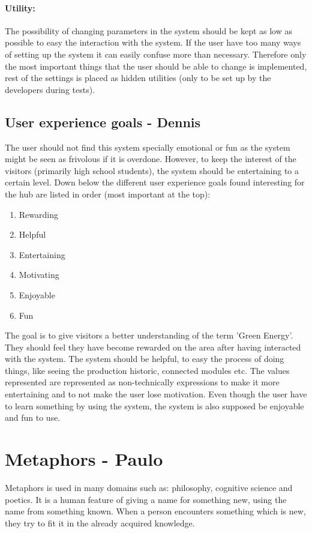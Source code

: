 \paragraph{Utility:}
The possibility of changing parameters in the system should be kept as low as possible to easy the interaction with the system. If the user have too many ways of setting up the system it can easily confuse more than necessary. Therefore only the most important things that the user should be able to change is implemented, rest of the settings is placed as hidden utilities (only to be set up by the developers during tests). 
\subsection{User experience goals - Dennis}
The user should not find this system specially emotional or fun as the system might be seen as frivolous if it is overdone. However, to keep the interest of the visitors (primarily high school students), the system should be entertaining to a certain level.  
Down below the different user experience goals found interesting for the hub are listed in order (most important at the top):
\begin{enumerate}
	\item Rewarding
	\item Helpful
	\item Entertaining
	\item Motivating
	\item Enjoyable
	\item Fun
\end{enumerate}
The goal is to give visitors a better understanding of the term 'Green Energy'. They should feel they have become rewarded on the area after having interacted with the system. The system should be helpful, to easy the process of doing things, like seeing the production historic, connected modules etc. The values represented are represented as non-technically expressions to make it more entertaining and to not make the user lose motivation. Even though the user have to learn something by using the system, the system is also supposed be enjoyable and fun to use.

\section{Metaphors - Paulo}

Metaphors is used in many domains such as: philosophy, cognitive science and poetics. It is a human feature of giving a name for something new, using the name from something known. When a person encounters something which is new, they try to fit it in the already acquired knowledge.

